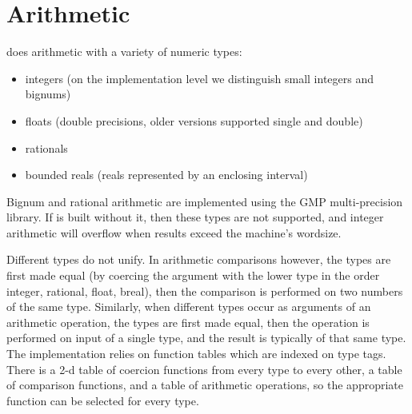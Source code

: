 %
% 
% 
% 
% 



\section{Arithmetic}
\label{secarith}

{\eclipse} does arithmetic  with a variety of numeric types:
\begin{itemize}
\item integers (on the implementation level we distinguish small integers
	and bignums)
\item floats (double  precisions, older versions supported single and double)
\item rationals
\item bounded reals  (reals represented by an enclosing interval)
\end{itemize}
Bignum and rational arithmetic are implemented using the GMP  multi-precision
library.  If {\eclipse} is built without it, then these types are not
supported, and integer arithmetic will overflow when results exceed the
machine's wordsize.

Different types do not unify.  In arithmetic comparisons however, the types
are first made equal (by coercing  the argument with the lower type in the
order integer, rational, float, breal), then the comparison is performed
on two numbers of the same type.
Similarly, when different types occur as arguments
of an arithmetic operation, the types are first made equal, then the operation is
performed on input of a single type, and the result is typically of
that same type.  The implementation relies on function tables  which are
indexed on type tags.  There is a 2-d table of coercion
functions from every type to every other, a table of comparison functions,
and a table of arithmetic operations,
so the appropriate function can be selected for every type.



